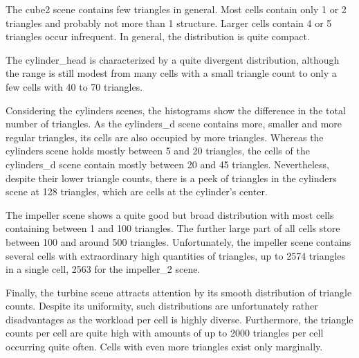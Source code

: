 The cube2 scene contains few triangles in general.
Most cells contain only 1 or 2 triangles and probably not more than 1 structure.
Larger cells contain 4 or 5 triangles occur infrequent.
In general, the distribution is quite compact.

The cylinder\_head is characterized by a quite divergent distribution, although the range is still modest from many cells with a small triangle count to only a few cells with 40 to 70 triangles.

Considering the cylinders scenes, the histograms show the difference in the total number of triangles.
As the cylinders\_d scene contains more, smaller and more regular triangles, its cells are also occupied by more triangles.
Whereas the cylinders scene holds mostly between 5 and 20 triangles, the cells of the cylinders\_d scene contain mostly between 20 and 45 triangles.
Nevertheless, despite their lower triangle counts, there is a peek of triangles in the cylinders scene at 128 triangles, which are cells at the cylinder's center.

The impeller scene shows a quite good but broad distribution with most cells containing between 1 and 100 triangles.
The further large part of all cells store between 100 and around 500 triangles.
Unfortunately, the impeller scene contains several cells with extraordinary high quantities of triangles, up to 2574 triangles in a single cell, 2563 for the impeller\_2 scene.

Finally, the turbine scene attracts attention by its smooth distribution of triangle counts.
Despite its uniformity, such distributions are unfortunately rather disadvantages as the workload per cell is highly diverse.
Furthermore, the triangle counts per cell are quite high with amounts of up to 2000 triangles per cell occurring quite often.
Cells with even more triangles exist only marginally.

